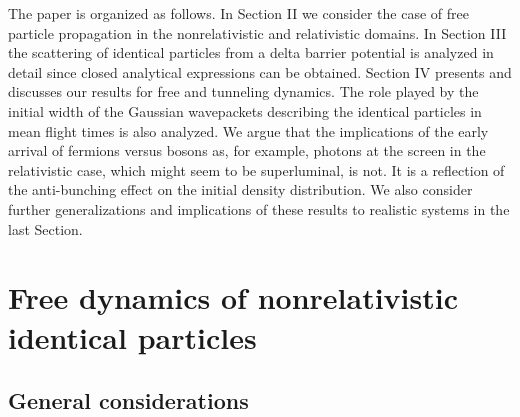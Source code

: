 \documentclass[preprint,aps]{revtex4}
\begin{document}
The paper is organized as follows. In Section II we consider the case of free particle propagation in the nonrelativistic and relativistic domains. In
Section III the scattering of identical particles from a delta barrier
potential is analyzed in detail since closed analytical expressions can be obtained.  Section IV presents and discusses our results for free and tunneling dynamics. The role played by the initial width of the Gaussian wavepackets describing the identical particles in mean flight times is also analyzed.
We argue that the implications of the early arrival of fermions versus bosons as, for example, photons at the screen in the relativistic case, which might seem to be superluminal, is not. It is a reflection of the anti-bunching effect on the initial density distribution.
We also consider further generalizations and
implications of these results to realistic systems in the last Section. 

\renewcommand{\theequation}{2.\arabic{equation}} \setcounter{section}{1} %
\setcounter{equation}{0}

\section{\protect\bigskip Free dynamics of nonrelativistic identical particles}

\subsection{General considerations}
\end{document}
